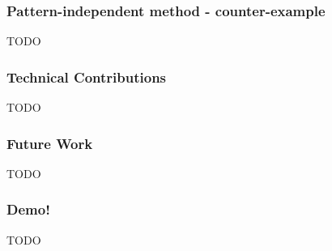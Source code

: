 \documentclass[aspectratio=1610]{beamer}
\begin{document}
\begin{frame}
	\frametitle{Pattern-independent method - counter-example}

	TODO
\end{frame}


\begin{frame}
	\frametitle{Technical Contributions}

	TODO

\end{frame}


\begin{frame}
	\frametitle{Future Work}


	TODO

%


\end{frame}

\begin{frame}
	\frametitle{Demo!}



	TODO


\end{frame}
\end{document}
